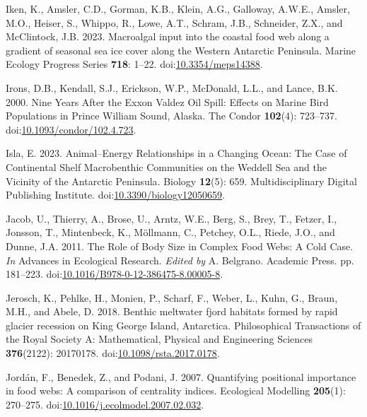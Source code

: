 \documentclass[
]{article}
\newlength{\cslhangindent}
\newenvironment{CSLReferences}[2] %
 {\begin{list}{}{%
  \setlength{\itemindent}{0pt}
  \setlength{\leftmargin}{0pt}
  \setlength{\parsep}{0pt}
  \ifodd #1
   \setlength{\leftmargin}{\cslhangindent}
   \setlength{\itemindent}{-1\cslhangindent}
  \fi
  \setlength{\itemsep}{#2\baselineskip}}}
 {\end{list}}
\begin{document}
\begin{CSLReferences}{1}{0}
Iken, K., Amsler, C.D., Gorman, K.B., Klein, A.G., Galloway, A.W.E.,
Amsler, M.O., Heiser, S., Whippo, R., Lowe, A.T., Schram, J.B.,
Schneider, Z.X., and McClintock, J.B. 2023. Macroalgal input into the
coastal food web along a gradient of seasonal sea ice cover along the
{Western Antarctic Peninsula}. Marine Ecology Progress Series
\textbf{718}: 1--22.
doi:\href{https://doi.org/10.3354/meps14388}{10.3354/meps14388}.

Irons, D.B., Kendall, S.J., Erickson, W.P., McDonald, L.L., and Lance,
B.K. 2000. Nine {Years After} the {Exxon Valdez Oil Spill}: {Effects} on
{Marine Bird Populations} in {Prince William Sound}, {Alaska}. The
Condor \textbf{102}(4): 723--737.
doi:\href{https://doi.org/10.1093/condor/102.4.723}{10.1093/condor/102.4.723}.

Isla, E. 2023. Animal--{Energy Relationships} in a {Changing Ocean}:
{The Case} of {Continental Shelf Macrobenthic Communities} on the
{Weddell Sea} and the {Vicinity} of the {Antarctic Peninsula}. Biology
\textbf{12}(5): 659. Multidisciplinary Digital Publishing Institute.
doi:\href{https://doi.org/10.3390/biology12050659}{10.3390/biology12050659}.

Jacob, U., Thierry, A., Brose, U., Arntz, W.E., Berg, S., Brey, T.,
Fetzer, I., Jonsson, T., Mintenbeck, K., Möllmann, C., Petchey, O.L.,
Riede, J.O., and Dunne, J.A. 2011. The {Role} of {Body Size} in {Complex
Food Webs}: {A Cold Case}. \emph{In} Advances in {Ecological Research}.
\emph{Edited by} A. Belgrano. Academic Press. pp. 181--223.
doi:\href{https://doi.org/10.1016/B978-0-12-386475-8.00005-8}{10.1016/B978-0-12-386475-8.00005-8}.

Jerosch, K., Pehlke, H., Monien, P., Scharf, F., Weber, L., Kuhn, G.,
Braun, M.H., and Abele, D. 2018. Benthic meltwater fjord habitats formed
by rapid glacier recession on {King George Island}, {Antarctica}.
Philosophical Transactions of the Royal Society A: Mathematical,
Physical and Engineering Sciences \textbf{376}(2122): 20170178.
doi:\href{https://doi.org/10.1098/rsta.2017.0178}{10.1098/rsta.2017.0178}.

Jordán, F., Benedek, Z., and Podani, J. 2007. Quantifying positional
importance in food webs: {A} comparison of centrality indices.
Ecological Modelling \textbf{205}(1): 270--275.
doi:\href{https://doi.org/10.1016/j.ecolmodel.2007.02.032}{10.1016/j.ecolmodel.2007.02.032}.


\end{CSLReferences}
\end{document}
